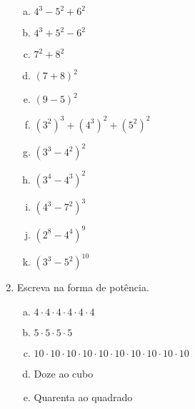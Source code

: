 \documentclass[a4paper,14pt]{article}
\begin{document}
\begin{multicols}{2}
\begin{enumerate}
\begin{enumerate}[a)]
            	\item $4^3 - 5^2 + 6^2$
            	\item $4^3 + 5^2 - 6^2$
            	\item $7^2 + 8^2$
            	\item $(7 + 8)^2$
            	\item $(9 - 5)^2$
            	\item $(3^2)^3 + (4^3)^2 + (5^2)^2$
            	\item $(3^3 - 4^2)^2$
            	\item $(3^4 - 4^3)^2$
            	\item $(4^3 - 7^2)^3$
            	\item $(2^8 - 4^4)^9$
            	\item $(3^3 - 5^2)^{10}$
            \end{enumerate}
            \item Escreva na forma de potência.
            \begin{enumerate}[a)]
            	\item $4 \cdot 4 \cdot 4 \cdot 4 \cdot 4 \cdot 4$
            	\item $5 \cdot 5 \cdot 5 \cdot 5$
            	\item $10 \cdot 10 \cdot 10 \cdot 10 \cdot 10 \cdot 10 \cdot 10 \cdot 10 \cdot 10 \cdot 10$
            	\item Doze ao cubo
            	\item Quarenta ao quadrado 
            \end{enumerate}
        \end{enumerate}
    $~$ \\ $~$ \\ $~$ \\ $~$ \\ $~$ \\ $~$ \\ $~$ \\ $~$ \\ $~$ \\ $~$ \\ $~$ \\ $~$ \\ $~$ \\ $~$ \\ $~$ \\ $~$ \\ $~$ \\ $~$ \\ $~$ \\ $~$ \\ $~$ \\ $~$ \\ $~$ \\ $~$ \\ $~$ \\ $~$ \\ $~$ \\ $~$ \\ $~$ \\ $~$ \\ 
    \end{multicols}
\end{document}
